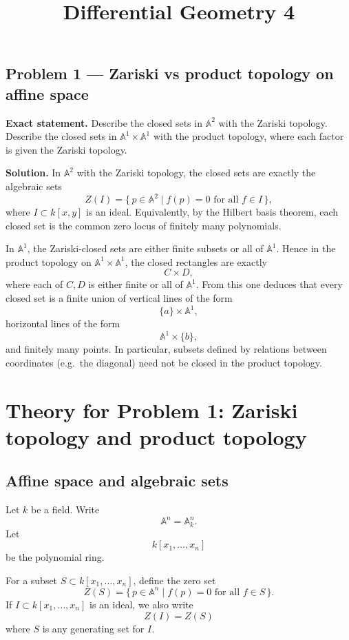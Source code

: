 \documentclass[12pt,a4paper]{article}
\title{Differential Geometry 4}
\author{}
\date{}
\theoremstyle{plain}
\theoremstyle{definition}      %
\begin{document}
	\maketitle

\subsection*{Problem 1 — Zariski vs product topology on affine space}

\textbf{Exact statement.}
Describe the closed sets in $\mathbb A^2$ with the Zariski topology.
Describe the closed sets in $\mathbb A^1 \times \mathbb A^1$ with the product topology,
where each factor is given the Zariski topology.

\textbf{Solution.}
In $\mathbb A^2$ with the Zariski topology, the closed sets are exactly the algebraic sets
\[
Z(I)
=
\{\,p\in \mathbb A^2 \mid f(p)=0 \text{ for all } f\in I\,\},
\]
where $I\subset k[x,y]$ is an ideal.
Equivalently, by the Hilbert basis theorem, each closed set is the common zero locus
of finitely many polynomials.

In $\mathbb A^1$, the Zariski-closed sets are either finite subsets or all of $\mathbb A^1$.
Hence in the product topology on $\mathbb A^1\times \mathbb A^1$,
the closed rectangles are exactly
\[
C\times D,
\]
where each of $C,D$ is either finite or all of $\mathbb A^1$.
From this one deduces that every closed set is a finite union of
vertical lines of the form
\[
\{a\}\times \mathbb A^1,
\]
horizontal lines of the form
\[
\mathbb A^1\times \{b\},
\]
and finitely many points.
In particular, subsets defined by relations between coordinates (e.g.\ the diagonal)
need not be closed in the product topology.

\section*{Theory for Problem 1: Zariski topology and product topology}

\subsection*{Affine space and algebraic sets}

Let $k$ be a field.
Write
\[
\mathbb A^n
=
\mathbb A^n_k.
\]
Let
\[
k[x_1,\dots,x_n]
\]
be the polynomial ring.

For a subset $S\subset k[x_1,\dots,x_n]$, define the zero set
\[
Z(S)
=
\{\,p\in \mathbb A^n \mid f(p)=0 \text{ for all } f\in S\,\}.
\]
If $I\subset k[x_1,\dots,x_n]$ is an ideal, we also write
\[
Z(I)
=
Z(S)
\]
where $S$ is any generating set for $I$.
\end{document}
